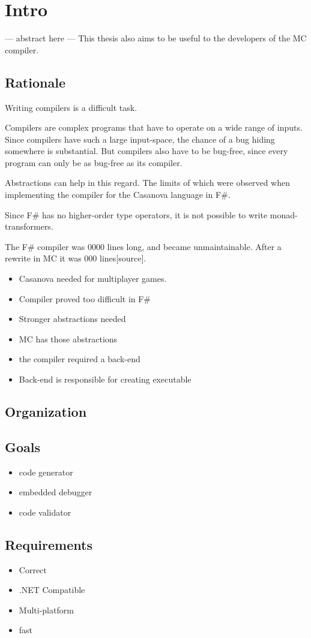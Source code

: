 \section{Intro}
--- abstract here ---
This thesis also aims to be useful to the developers of the MC compiler.

\subsection{Rationale}
Writing compilers is a difficult task.

Compilers are complex programs that have to operate on a wide range of inputs.
Since compilers have such a large input-space, the chance of a bug hiding somewhere is substantial. 
But compilers also have to be bug-free, since every program can only be as bug-free as its compiler.

Abstractions can help in this regard.
The limits of which were observed when implementing the compiler for the Casanova language in F\#.

Since F\# has no higher-order type operators, it is not possible to write monad-transformers.

The F\# compiler was 0000 lines long, and became unmaintainable.
After a rewrite in MC it was 000 lines[source].

\begin{itemize}
    \item Casanova needed for multiplayer games.
    \item Compiler proved too difficult in F\#
    \item Stronger abstractions needed
    \item MC has those abstractions
    \item the compiler required a back-end
    \item Back-end is responsible for creating executable
\end{itemize}

\subsection{Organization}

\subsection{Goals}
\begin{itemize}
    \item code generator
    \item embedded debugger
    \item code validator
\end{itemize}

\subsection{Requirements}
\begin{itemize}
    \item Correct
    \item .NET Compatible
    \item Multi-platform
    \item fast
\end{itemize}
